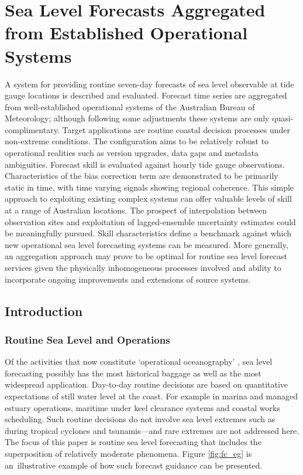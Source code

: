 \chapter{Sea Level Forecasts Aggregated from Established Operational Systems}


A system for providing routine seven-day forecasts of sea level observable at tide gauge locations is described and evaluated.
Forecast time series are aggregated from well-established operational systems of the Australian Bureau of Meteorology; although following some adjustments these systems are only quasi-complimentary.
Target applications are routine coastal decision processes under non-extreme conditions.
The configuration aims to be relatively robust to operational realities such as version upgrades, data gaps and metadata ambiguities.
Forecast skill is evaluated against hourly tide gauge observations.  
Characteristics of the bias correction term are demonstrated to be primarily static in time, with time varying signals showing regional coherence.
This simple approach to exploiting existing complex systems can offer valuable levels of skill at a range of Australian locations.
The prospect of interpolation between observation sites and exploitation of lagged-ensemble uncertainty estimates could be meaningfully pursued. 
Skill characteristics define a benchmark against which new operational sea level forecasting systems can be measured. 
More generally, an aggregation approach may prove to be optimal for routine sea level forecast services given the physically inhomogeneous processes involved and ability to incorporate ongoing improvements and extensions of source systems.


\section{Introduction}
\subsection{Routine Sea Level and Operations}

Of the activities that now constitute `operational oceanography' \cite{Bell:2009uv}, sea level forecasting possibly has the most historical baggage as well as the most widespread application.
Day-to-day routine decisions are based on quantitative expectations of still water level \cite{Pugh:2014di} at the coast.  
For example in marina and managed estuary operations, maritime under keel clearance systems and coastal works scheduling. 
Such routine decisions do not involve sea level extremes such as during tropical cyclones and tsunamis---and rare extremes are not addressed here. 
The focus of this paper is routine sea level forecasting that includes the superposition of relatively moderate phenomena.
Figure \ref{fig:fc_eg} is an~illustrative example of how such forecast guidance can be presented. 


